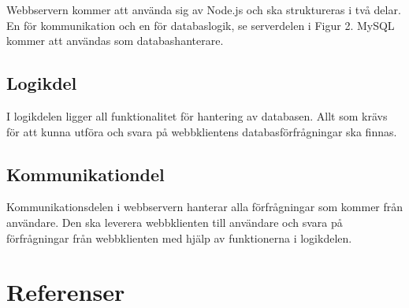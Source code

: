 \documentclass[a4paper,10pt]{article}
\begin{document}
Webbservern kommer att använda sig av Node.js och ska struktureras i två delar. En för kommunikation och en för databaslogik, se serverdelen i Figur 2. MySQL kommer att användas som databashanterare.

\subsection{Logikdel}
I logikdelen ligger all funktionalitet för hantering av databasen. Allt som krävs för att kunna utföra och svara på webbklientens databasförfrågningar ska finnas.

\subsection{Kommunikationdel}
Kommunikationsdelen i webbservern hanterar alla förfrågningar som kommer från användare. Den ska leverera webbklienten till användare och svara på förfrågningar från webbklienten med hjälp av funktionerna i logikdelen.

\section{Referenser}
\end{document}
